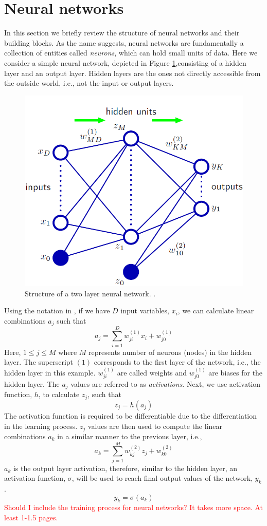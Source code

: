 \section{Neural networks}
In this section we briefly review the structure of neural networks and their building blocks. As the name suggests, neural networks are fundamentally a collection of entities called \textit{neurons}, which can hold small units of data. Here we consider a simple neural network, depicted in Figure \ref{fig:nn},consisting of a hidden layer and an output layer. Hidden layers are the ones not directly accessible from the outside world, i.e., not the input or output layers.
\begin{figure}
    \includegraphics[width=0.5\linewidth ]{figures/neural_net.png}
    \centering
    \caption{Structure of a two layer neural network. \cite{bishop2006pattern}.}
    \label{fig:nn}
\end{figure}

Using the notation in \cite{bishop2006pattern}, if we have $D$ input variables, $x_{i}$, we can calculate linear combinations $a_{j}$ such that
\[
    a_{j}=\sum_{i=1}^{D}w^{(1)}_{ji}x_{i} + w^{(1)}_{j0}
\]
Here, $1 \leq j \leq M$ where $M$ represents number of neurons (nodes) in the hidden layer. The superscript $(1)$ corresponds to the first layer of the network, i.e., the hidden layer in this example. $w^{(1)}_{ji}$ are called weights and $w^{(1)}_{j0}$ are biases for the hidden layer.
The $a_{j}$ values are referred to as \textit{activations}. Next, we use activation function, $h$, to calculate $z_{j}$, such that
\[
    z_{j}=h(a_{j})
\]
The activation function is required to be differentiable due to the differentiation in the learning process. $z_{j}$ values are then used to compute the linear combinations $a_{k}$ in a similar manner to the previous layer, i.e., 
\[
a_{k}=\sum_{j=1}^{M}w^{(2)}_{kj}z_{j} + w^{(2)}_{k0}
\]
$a_{k}$ is the output layer activation, therefore, similar to the hidden layer, an activation function, $\sigma$, will be used to reach final output values of the network, $y_{k}$.
\[
y_{k}=\sigma(a_{k})
\]
\textcolor{red}{Should I include the training process for neural networks? It takes more space. At least 1-1.5 pages.}


